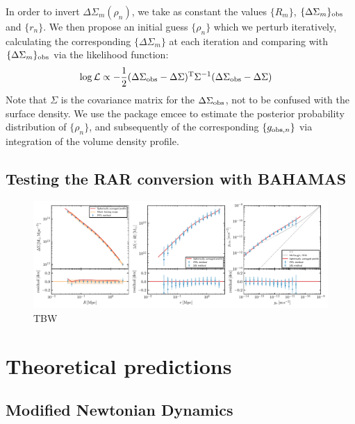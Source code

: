 \documentclass[usenatbib]{mnras}
\begin{document}
In order to invert $\Delta\Sigma_m(\rho_n)$, we take as constant the values $\{R_m\}$, $\{\Delta\Sigma_m\}_{\rm obs}$ and $\{r_n\}$. We then propose an initial guess $\{\rho_n\}$ which we perturb iteratively, calculating the corresponding $\{\Delta\Sigma_m\}$ at each iteration and comparing with $\{\Delta\Sigma_m\}_{\rm obs}$ via the likelihood function:
\begin{align}
\log\mathcal{L} &\propto -\frac{1}{2}(\Delta\Sigma_{\rm obs}-\Delta\Sigma)^{\rm T}\Sigma^{-1}(\Delta\Sigma_{\rm obs}-\Delta\Sigma)
\end{align}
Note that $\Sigma$ is the covariance matrix for the $\Delta\Sigma_{\rm obs}$, not to be confused with the surface density. We use the package {\sc emcee} \citep{foreman-mackey13} to estimate the posterior probability distribution of $\{\rho_n\}$, and subsequently of the corresponding $\{g_{{\rm obs},n}\}$ via integration of the volume density profile.


\subsection{Testing the RAR conversion with BAHAMAS}
\label{sec:conversion_test}

\begin{figure}
  \includegraphics[width=1.\textwidth]{Figures/compare_method}
  \caption{TBW}
  \label{fig:compare_method}
\end{figure}

\section{Theoretical predictions}
\label{sec:theories}

\subsection{Modified Newtonian Dynamics}
\label{sec:MOND}
\end{document}
